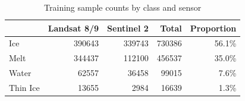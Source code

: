 \begin{table}
\caption{Training sample counts by class and sensor}
\label{tab:training_samples}
\begin{tabular}{lrrrr}
\toprule
 & Landsat 8/9 & Sentinel 2 & Total & Proportion \\
\midrule
Ice & 390643 & 339743 & 730386 & 56.1\% \\
Melt & 344437 & 112100 & 456537 & 35.0\% \\
Water & 62557 & 36458 & 99015 & 7.6\% \\
Thin Ice & 13655 & 2984 & 16639 & 1.3\% \\
\bottomrule
\end{tabular}
\end{table}
